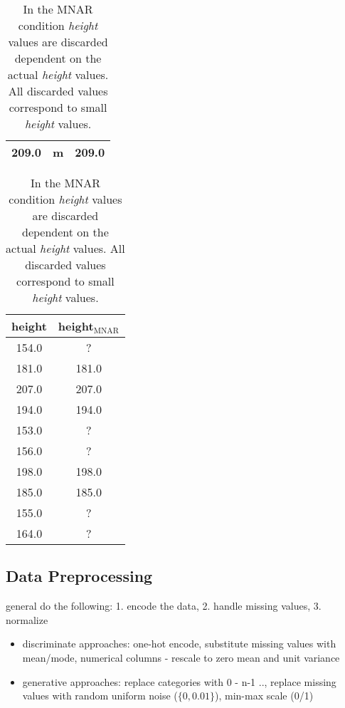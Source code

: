\begin{table}
\begin{minipage}{0.3\textwidth}
\begin{tabular}{ccc}
  209.0 &      m &                209.0 \\
\bottomrule
\end{tabular}
\caption{In the MAR condition \textit{height} values are discarded dependent on values in another column,  here \textit{gender}. All discarded \textit{height} values correspond to rows in which \textit{gender} was \textit{male}.
}
	\label{tab:missingness_patterns_MAR}
\end{minipage}
\hfill
\begin{minipage}{0.28\textwidth}
\centering
	\begin{tabular}{cc}
\toprule
 height &  height$_{\text{MNAR}}$ \\
\midrule
  154.0 &                     ? \\
  181.0 &                 181.0 \\
  207.0 &                 207.0 \\
  194.0 &                 194.0 \\
  153.0 &                     ? \\
  156.0 &                     ? \\
  198.0 &                 198.0 \\
  185.0 &                 185.0 \\
  155.0 &                     ? \\
  164.0 &                     ? \\
\bottomrule
\end{tabular}
\caption{In the MNAR condition \textit{height} values are discarded dependent on the actual \textit{height} values. All discarded values correspond to small \textit{height} values.
}
	\label{tab:missingness_patterns_MNAR}
\vspace{1em}
\end{minipage}

\end{table}

\subsection{Data Preprocessing}

general do the following: 1. encode the data, 2. handle missing values, 3. normalize

\begin{itemize}
	\item discriminate approaches: one-hot encode, substitute missing values with mean/mode, numerical columns - rescale to zero mean and unit variance
	\item generative approaches: replace categories with 0 - n-1 .., replace missing values with random uniform noise ($\{0, 0.01\}$), min-max scale (0/1)
\end{itemize}

